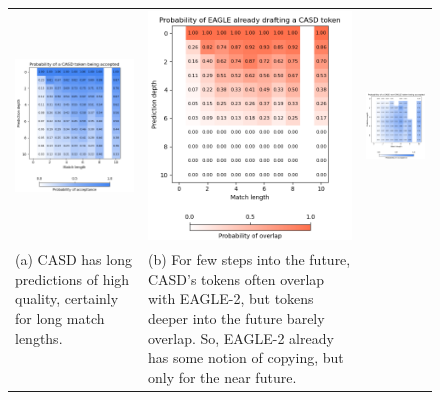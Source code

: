 \begin{landscape}

\begin{figure}
  \centering
  \captionsetup{width=0.52\linewidth}
  \begin{tabular}{@{}l@{}@{}l@{}@{}l@{}}
    \includegraphics[width=.33\linewidth]{fig/prob_casd_accept.png} & \includegraphics[width=.33\linewidth]{fig/prob_casd_eagle_overlap.png} & \includegraphics[width=.30\linewidth, height=.371\linewidth]{fig/prob_casd_non_eagle_accept.png} \\[0.5cm]
    \hspace{0.5cm} \parbox{.27\linewidth}{\small (a) CASD has long predictions of high quality, certainly for long match lengths. \newline \newline \newline} 
    & \hspace{0.5cm} \parbox{.27\linewidth}{\small (b) For few steps into the future, CASD's tokens often overlap with EAGLE-2, but tokens deeper into the future barely overlap. So, EAGLE-2 already has some notion of copying, but only for the near future.}

\end{tabular}
\end{figure}
\end{landscape}
